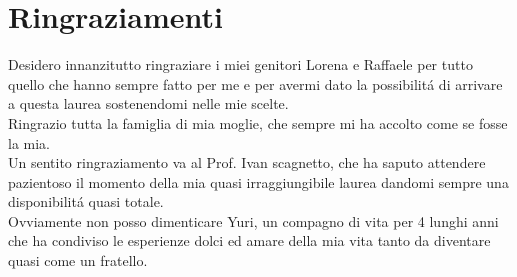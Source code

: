 \chapter{Ringraziamenti}
Desidero innanzitutto ringraziare i miei genitori Lorena e Raffaele per tutto quello che hanno sempre fatto per me e per avermi dato la possibilit\'a di arrivare a questa laurea sostenendomi nelle mie scelte.\\
Ringrazio tutta la famiglia di mia moglie, che sempre mi ha accolto come se fosse la mia.\\
Un sentito ringraziamento va al Prof. Ivan scagnetto, che ha saputo attendere pazientoso il momento della mia quasi irraggiungibile laurea dandomi sempre una disponibilit\'a quasi totale.\\
Ovviamente non posso dimenticare Yuri, un compagno di vita per 4 lunghi anni che ha condiviso le esperienze dolci ed amare della mia vita tanto da diventare quasi come un fratello.
